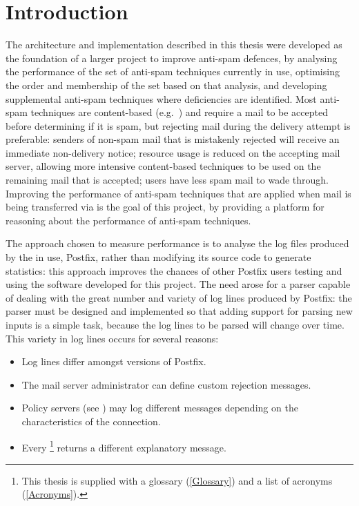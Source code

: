 \chapter{Introduction}

\label{introduction}

The architecture and implementation described in this thesis were developed
as the foundation of a larger project to improve anti-spam defences, by
analysing the performance of the set of anti-spam techniques currently in
use, optimising the order and membership of the set based on that analysis,
and developing supplemental anti-spam techniques where deficiencies are
identified.  Most anti-spam techniques are content-based
(e.g.~\cite{a-plan-for-spam, relaxed-online-svms, word-stemming}) and
require a mail to be accepted before determining if it is spam, but
rejecting mail during the delivery attempt is preferable: senders of
non-spam mail that is mistakenly rejected will receive an immediate
non-delivery notice; resource usage is reduced on the accepting mail
server, allowing more intensive content-based techniques to be used on the
remaining mail that is accepted; users have less spam mail to wade through.
Improving the performance of anti-spam techniques that are applied when
mail is being transferred via  is the goal of this project,
by providing a platform for reasoning about the performance of anti-spam
techniques.

The approach chosen to measure performance is to analyse the log files
produced by the  in use, Postfix, rather than modifying its
source code to generate statistics: this approach improves the chances of
other Postfix users testing and using the software developed for this
project.  The need arose for a parser capable of dealing with the great
number and variety of log lines produced by Postfix: the parser must be
designed and implemented so that adding support for parsing new inputs is a
simple task, because the log lines to be parsed will change over time.
This variety in log lines occurs for several reasons:

\begin{itemize}

    \squeezeitems{}

    \item Log lines differ amongst versions of Postfix.

    \item The mail server administrator can define custom rejection
        messages.

    \item Policy servers (see ) may log
        different messages depending on the characteristics of the
        connection.

    \item Every \footnote{This thesis is supplied with a
        glossary (\textsection\ref{Glossary}) and a list of acronyms
        (\textsection\ref{Acronyms}).} returns a different explanatory
        message.

\end{itemize}

